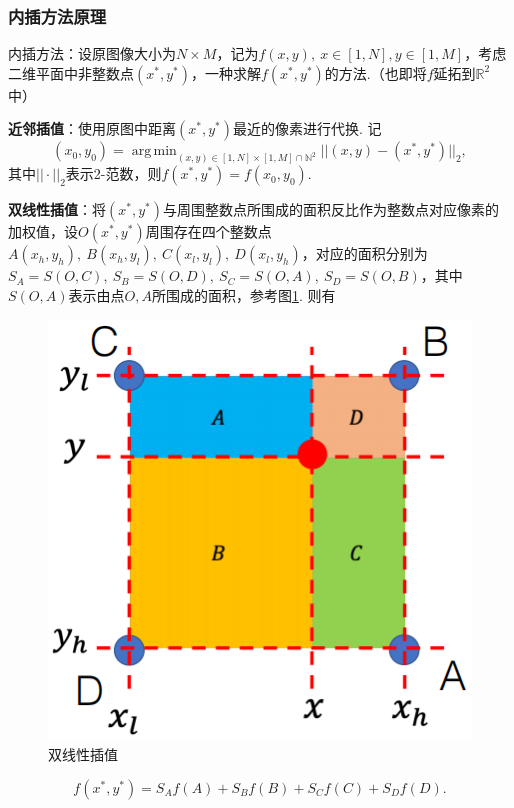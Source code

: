 \documentclass[12pt, a4paper, oneside]{ctexart}
\numberwithin{equation}{section}  %
\DeclareMathOperator*{\argmax}{arg\,max}  %
\DeclareMathOperator*{\argmin}{arg\,min}  %
\def\R{\mathbb{R}}          %
\def\N{\mathbb{N}}          %
\def\del{\vspace{-1.5ex}}   %
\begin{document}
\subsubsection{内插方法原理}
内插方法：设原图像大小为$N\times M$，记为$f(x,y),\ x\in[1,N],y\in[1,M]$，考虑二维平面中非整数点$(x^*, y^*)$，一种求解$f(x^*,y^*)$的方法.（也即将$f$延拓到$\R^2$中）

\textbf{近邻插值}：使用原图中距离$(x^*,y^*)$最近的像素进行代换. 记\del
\begin{equation*}
 (x_0,y_0) = \argmin_{(x,y)\in[1,N]\times[1,M]\cap \N^2}||(x,y)-(x^*,y^*)||_2,
\end{equation*}
其中$||\cdot||_2$表示2-范数，则$f(x^*,y^*) = f(x_0,y_0)$.

\textbf{双线性插值}：将$(x^*,y^*)$与周围整数点所围成的面积反比作为整数点对应像素的加权值，设$O(x^*,y^*)$周围存在四个整数点$A(x_h, y_h),\ B(x_h, y_l),\ C(x_l, y_l),\ D(x_l, y_h)$，对应的面积分别为$S_A = S(O,C),\ S_B = S(O, D),\ S_C = S(O, A),\ S_D = S(O, B)$，其中$S(O,A)$表示由点$O,A$所围成的面积，参考图\ref{双线性插值}. 则有\del\del

{\begin{figure} %
    \centering
    \includegraphics[scale=1.2]{双线性插值.png}
    \caption{双线性插值}
    \label{双线性插值}
\end{figure}
\begin{equation*}
    f(x^*, y^*) = S_Af(A)+S_Bf(B)+S_Cf(C)+S_Df(D).
\end{equation*}}
\vspace{2cm}
\end{document}
